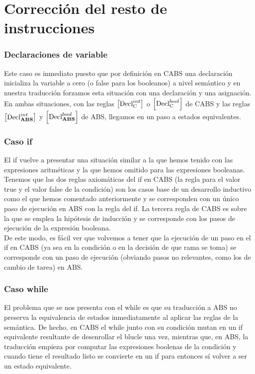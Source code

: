 \section{Corrección del resto de instrucciones}

\subsubsection{Declaraciones de variable}
Este caso es inmediato puesto que por definición en CABS una declaración inicializa la variable a cero (o false para los booleanos) a nivel semántico y en nuestra traducción forzamos esta situación con una declaración y una asignación. En ambas situaciones, con las reglas $\left[ \text{Decl}_{\text{C}}^{int} \right]$ o $\left[ \text{Decl}_{\text{C}}^{bool} \right]$ de CABS y las reglas $\left[ \text{Decl}_{\text{\textbf{ABS}}}^{int} \right]$ y $\left[ \text{Decl}_{\text{\textbf{ABS}}}^{bool} \right]$ de ABS, llegamos en un paso a estados equivalentes.

\subsubsection{Caso if}
El if vuelve a presentar una situación similar a la que hemos tenido con las expresiones aritméticas y la que hemos omitido para las expresiones booleanas.\\

Tenemos que las dos reglas axiomáticas del if en CABS (la regla para el valor true y el valor false de la condición) son los casos base de un desarrollo inductivo como el que hemos comentado anteriormente y se corresponden con un único paso de ejecución en ABS con la regla del if. La tercera regla de CABS es sobre la que se emplea la hipótesis de inducción y se corresponde con los pasos de ejecución de la expresión booleana.\\

De este modo, es fácil ver que volvemos a tener que la ejecución de un paso en el if en CABS (ya sea en la condición o en la decisión de que rama se toma) se corresponde con un paso de ejecución (obviando pasos no relevantes, como los de cambio de tarea) en ABS.

\subsubsection{Caso while}
El problema que se nos presenta con el while es que su traducción a ABS no preserva la equivalencia de estados inmediatamente al aplicar las reglas de la semántica. De hecho, en CABS el while junto con su condición mutan en un if equivalente resultante de desenrollar el blucle una vez, mientras que, en ABS, la traducción empieza por computar las expresiones boolenas de la condición y cuando tiene el resultado listo se convierte en un if para entonces sí volver a ser un estado equivalente.\\

